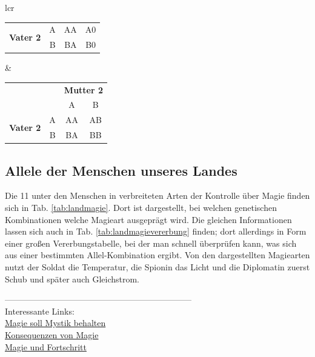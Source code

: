 \begin{table}[htb]
\begin{threeparttable}
\begin{tabular}{lcr}
\begin{tabular}{cc|cc}
				\multirow{2}{*}{\textbf{Vater 2}} & A & AA &                A0                \\
				                                  & B & BA &                B0                \\ \bottomrule
			\end{tabular}
			&
			\begin{tabular}{cc|cc}
				&   & \multicolumn{2}{c}{\textbf{Mutter 2}} \\
				&   & A  &                B                 \\ \midrule
				\multirow{2}{*}{\textbf{Vater 2}} & A & AA &                AB                \\
				& B & BA &                BB                \\ \bottomrule
			\end{tabular}
			\end{tabular}
		\end{threeparttable}
\end{table}


\subsection{Allele der Menschen unseres Landes}
Die 11 unter den Menschen in  verbreiteten Arten der Kontrolle über Magie finden sich in Tab. \ref{tab:landmagie}.
Dort ist dargestellt, bei welchen genetischen Kombinationen welche Magieart ausgeprägt wird.
Die gleichen Informationen lassen sich auch in Tab. \ref{tab:landmagievererbung} finden; 
dort allerdings in Form einer großen Vererbungstabelle, bei der man schnell überprüfen kann, was sich aus einer bestimmten Allel-Kombination ergibt.
Von den dargestellten Magiearten nutzt der Soldat die Temperatur,
die Spionin das Licht
und die Diplomatin zuerst Schub und später auch Gleichstrom.

------------------------------------------------------------------ \\
Interessante Links: \\
\href{http://www.weltenbau-wissen.de/2015/12/magie-weltenbau-magiesystem-mystik-wissenschaft-teil-1/}{Magie soll Mystik behalten}\\
\href{http://www.weltenbau-wissen.de/2016/01/6-konsequenzen-magie/}{Konsequenzen von Magie}\\
\href{https://meisterperson.wordpress.com/2016/05/05/magie-fortschritt/?pk_campaign=pifeed\&pk_kwd=magie-fortschritt}{Magie und Fortschritt}

